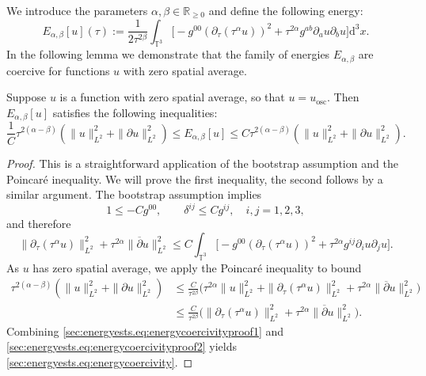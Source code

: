 \documentclass{article}
\newcommand{\RR}{\mathbb{R}}
\newcommand{\TT}{\mathbb{T}}
\newcommand{\osc}{\mathrm{osc}}
\newcommand{\de}{\mathrm{d}}
\newcommand{\ol}{\overline}
\newcommand{\pa}{\partial}
\begin{document}
We introduce the parameters $\alpha, \beta \in \RR_{\geq 0}$ and define the following energy: 
\begin{equation}\label{sec:energyests.eq:energydef}
    E_{\alpha,\beta}[u](\tau) := \frac{1}{2\tau^{2\beta}}\int_{\TT^3} \Big[-g^{00}(\pa_\tau( \tau^{\alpha} u))^2 + \tau^{2\alpha}g^{ab}\pa_a u \pa_b u\Big] \de^3 x.
\end{equation}
In the following lemma we demonstrate that the family of energies $E_{\alpha,\beta}$ are coercive for functions $u$ with zero spatial average.
\begin{lemma}\label{sec:energyests.lem:energycoercivity}
    Suppose $u$ is a function with zero spatial average, so that $u = u_{\osc}$. Then $E_{\alpha,\beta}[u]$ satisfies the following inequalities:
    \begin{equation}\label{sec:energyests.eq:energycoercivity}
        \frac{1}{C}\tau^{2(\alpha-\beta)}(\|u\|_{L^2}^2 + \|\pa u\|_{L^2}^2) \leq E_{\alpha,\beta}[u] \leq C\tau^{2(\alpha-\beta)}(\|u\|_{L^2}^2 + \|\pa u\|_{L^2}^2).
    \end{equation}
\end{lemma}
\begin{proof}
    This is a straightforward application of the bootstrap assumption and the Poincar\'e inequality. We will prove the first inequality, the second follows by a similar argument. The bootstrap assumption implies
    \begin{equation}
        1 \leq -Cg^{00},\qquad \delta^{ij}\leq Cg^{ij},\quad i,j=1,2,3,
    \end{equation}
    and therefore
    \begin{equation}\label{sec:energyests.eq:energycoercivityproof1}
        \|\pa_\tau (\tau^\alpha u)\|_{L^2}^2 + \tau^{2\alpha}\|\ol{\pa} u\|_{L^2}^2 \leq C\int_{\TT^3}\Big[-g^{00}(\pa_\tau (\tau^\alpha u))^2 + \tau^{2\alpha} g^{ij}\pa_i u \pa_j u].
    \end{equation}
    As $u$ has zero spatial average, we apply the Poincar\'e inequality to bound
    \begin{align}
        \tau^{2(\alpha-\beta)}(\|u\|_{L^2}^2 + \|\pa u\|_{L^2}^2) &\leq \frac{C}{\tau^{2\beta}}\big(\tau^{2\alpha}\|u\|_{L^2}^2 + \|\pa_\tau (\tau^\alpha u)\|_{L^2}^2+ \tau^{2\alpha}\|\ol{\pa} u\|_{L^2}^2\big)\nonumber\\
        &\leq \frac{C}{\tau^{2\beta}} \big(\|\pa_\tau (\tau^\alpha u)\|_{L^2}^2 + \tau^{2\alpha}\|\ol{\pa} u\|_{L^2}^2\big).\label{sec:energyests.eq:energycoercivityproof2}
    \end{align}
    Combining \eqref{sec:energyests.eq:energycoercivityproof1} and \eqref{sec:energyests.eq:energycoercivityproof2} yields \eqref{sec:energyests.eq:energycoercivity}.
\end{proof}
\end{document}
